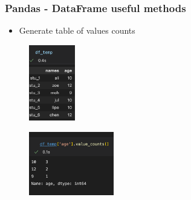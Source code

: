 \begin{frame}\frametitle{Pandas - DataFrame useful methods}
   \begin{minipage}{0.58\linewidth}
      \begin{itemize}
         \item Generate table of values counts
      \end{itemize}
      \vspace{.5cm}
      \begin{figure}[H]
         \includegraphics[width=2cm]{../images/illustrations/pandas_df_ex_2.png}
      \end{figure}
   \end{minipage}
   \begin{minipage}{0.38\linewidth}
      \begin{figure}[H]
         \includegraphics[width=3.7cm]{../images/illustrations/pandas_value_counts.png}
      \end{figure}
   \end{minipage}
\end{frame}


